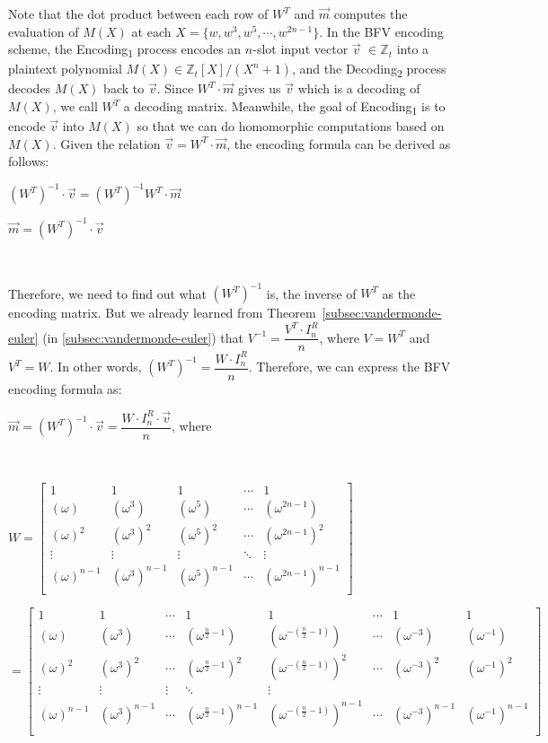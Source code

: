 Note that the dot product between each row of $W^T$ and $\vec{m}$ computes the evaluation of $M(X)$ at each $X = \{w, w^3, w^5, \cdots, w^{2n-1}\}$. In the BFV encoding scheme, the \textsf{Encoding\textsubscript{1}} process encodes an $n$-slot input vector $\vec{v}$ $\in \mathbb{Z}_t$ into a plaintext polynomial $M(X) \in \mathbb{Z}_t[X] / (X^n + 1)$, and the \textsf{Decoding\textsubscript{2}} process decodes $M(X)$ back to $\vec{v}$. Since $W^T \cdot \vec{m}$ gives us $\vec{v}$ which is a decoding of $M(X)$, we call $W^T$ a decoding matrix. Meanwhile, the goal of \textsf{Encoding\textsubscript{1}} is to encode $\vec{v}$ into $M(X)$ so that we can do homomorphic computations based on $M(X)$. Given the relation $\vec{v} = W^T \cdot \vec{m}$, the encoding formula can be derived as follows:

$(W^T)^{-1} \cdot \vec{v} = (W^T)^{-1} W^T \cdot \vec{m}$

$\vec{m} = (W^T)^{-1} \cdot \vec{v}$

$ $

Therefore, we need to find out what $(W^T)^{-1}$ is, the inverse of $W^T$ as the encoding matrix. But we already learned from Theorem~\ref*{subsec:vandermonde-euler} (in \autoref{subsec:vandermonde-euler}) that $V^{-1} = \dfrac{V^T \cdot I_n^R}{n}$, where $V = W^T$ and $V^T = W$. In other words, $(W^T)^{-1} = \dfrac{W \cdot I_n^R}{n}$. Therefore, we can express the BFV encoding formula as: 

$\vec{m} = (W^T)^{-1} \cdot \vec{v} = \dfrac{W \cdot I_n^R \cdot \vec{v}}{n}$, \text{ } where

$ $

$W =  \begin{bmatrix}
1 & 1 & 1 & \cdots & 1\\
(\omega) & (\omega^3) & (\omega^5) & \cdots & (\omega^{2n-1})\\
(\omega)^2 & (\omega^3)^2 & (\omega^5)^2 & \cdots & (\omega^{2n-1})^2\\
\vdots & \vdots & \vdots & \ddots & \vdots \\
(\omega)^{n-1} & (\omega^3)^{n-1} & (\omega^5)^{n-1} & \cdots & (\omega^{2n-1})^{n-1}\\
\end{bmatrix}$

$= \begin{bmatrix}
1 & 1 & \cdots & 1 & 1 & \cdots & 1 & 1\\
(\omega) & (\omega^3) & \cdots & (\omega^{\frac{n}{2} - 1}) & (\omega^{-(\frac{n}{2} - 1)}) & \cdots & (\omega^{-3}) & (\omega^{-1})\\
(\omega)^2 & (\omega^3)^2 & \cdots & (\omega^{\frac{n}{2} - 1})^2 & (\omega^{-(\frac{n}{2} - 1)})^2 & \cdots & (\omega^{-3})^2 & (\omega^{-1})^2\\
\vdots & \vdots & \vdots & \ddots & \vdots \\
(\omega)^{n-1} & (\omega^3)^{n-1} & \cdots & (\omega^{\frac{n}{2} - 1})^{n-1} & (\omega^{-(\frac{n}{2} - 1)})^{n-1} & \cdots & (\omega^{-3})^{n-1} & (\omega^{-1})^{n-1}\\
\end{bmatrix}$

